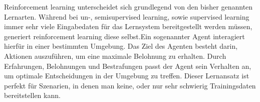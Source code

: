 Reinforcement learning unterscheidet sich grundlegend von den bisher genannten
Lernarten. Während bei un-, semisupervised learning, sowie supervised learning
immer sehr viele Eingabedaten für das Lernsystem bereitgestellt werden müssen,
generiert reinforcement learning diese selbst.Ein sogenannter Agent interagiert
hierfür in einer bestimmten Umgebung. Das Ziel des Agenten besteht darin,
Aktionen auszuführen, um eine maximale Belohnung zu erhalten. Durch
Erfahrungen, Belohnungen und Bestrafungen passt der Agent sein Verhalten an, um
optimale Entscheidungen in der Umgebung zu treffen. Dieser Lernansatz ist
perfekt für Szenarien, in denen man keine, oder nur sehr schwierig
Trainingsdaten bereitstellen kann. \cite{lanquillon2019grundzuge}